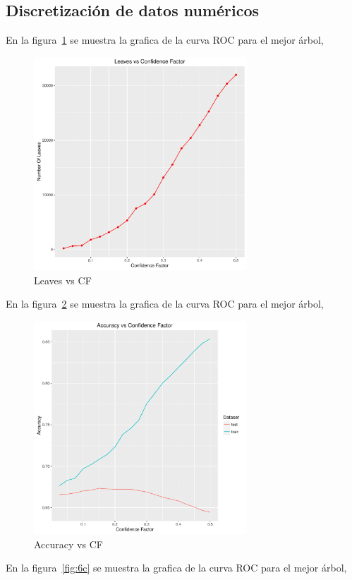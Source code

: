 \subsection{Discretización de datos numéricos}

En la figura~\ref{fig:6a} se muestra la grafica de la curva ROC para el mejor árbol,

\begin{figure}
  \centering
  \includegraphics[width = 8cm]{6a.pdf}
  \caption{Leaves vs CF}
  \label{fig:6a}
\end{figure}

En la figura~\ref{fig:6b} se muestra la grafica de la curva ROC para el mejor árbol,

\begin{figure}
  \centering
  \includegraphics[width = 8cm]{6b.pdf}
  \caption{Accuracy vs CF}
  \label{fig:6b}
\end{figure}

En la figura~\ref{fig:6c} se muestra la grafica de la curva ROC para el mejor árbol,

